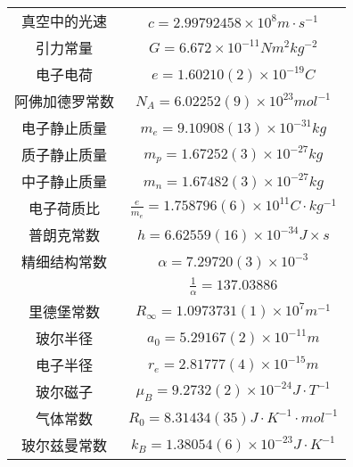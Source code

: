 \begin{center}

\begin{tabular}{|c|c|}
  \hline
  真空中的光速 & $c = 2.99792458\times 10^8 m\cdot s^{-1}$ \\

  引力常量 & $G = 6.672 \times 10^{-11} N m^2 kg^{-2} $ \\

  电子电荷 & $e = 1.60210(2)\times 10^{-19} C$  \\

  阿佛加德罗常数 & $N_A = 6.02252(9)\times 10^{23} mol^{-1}$ \\

  电子静止质量 & $m_e = 9.10908(13)\times 10^{-31} kg$ \\

  质子静止质量 & $m_p = 1.67252(3)\times 10^{-27} kg$ \\

  中子静止质量 & $m_n = 1.67482(3)\times 10^{-27} kg$ \\

  电子荷质比 & $\frac{e}{m_e} = 1.758796(6)\times 10^{11} C\cdot kg^{-1}$ \\

  普朗克常数 & $h = 6.62559(16)\times 10^{-34} J\times s$ \\

  精细结构常数 & $\alpha = 7.29720(3)\times 10^{-3}$ \\
   & $\frac{1}{\alpha} = 137.03886$ \\

  里德堡常数 & $R_{\infty} = 1.0973731(1)\times 10^7 m^{-1}$ \\

  玻尔半径 & $a_0 = 5.29167(2) \times 10^{-11} m$ \\

  电子半径 & $r_e = 2.81777(4)\times 10^{-15} m$ \\

  玻尔磁子 & $\mu_B = 9.2732(2)\times 10^{-24} J\cdot T^{-1}$ \\

  气体常数 & $R_0 = 8.31434(35) J\cdot K^{-1} \cdot mol^{-1}$ \\

  玻尔兹曼常数 & $k_B = 1.38054(6)\times 10^{-23} J\cdot K^{-1}$ \\


\end{tabular}
\end{center}
